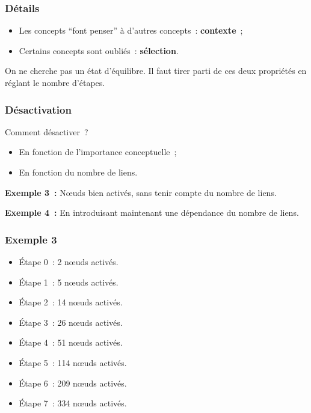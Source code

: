 \documentclass[12pt, handout]{beamer}
\begin{document}
\begin{frame}
 \frametitle{Détails}
 
 \begin{itemize}
  \item Les concepts ``font penser'' à d'autres concepts~: \textbf{contexte}~;
  \item Certains concepts sont oubliés~: \textbf{sélection}.
 \end{itemize}

 On ne cherche pas un état d'équilibre. Il faut tirer parti de ces deux propriétés en réglant le nombre d'étapes.
 
\end{frame}

\begin{frame}
  \frametitle{Désactivation}
 
 \begin{block}{Comment désactiver~?}
 \begin{itemize}
  \item En fonction de l'importance conceptuelle~;
  \item En fonction du nombre de liens.
  \end{itemize}
 \end{block}

 \textbf{Exemple 3~:}  N\oe{}uds bien activés, sans tenir compte du nombre de liens.
 
 \textbf{Exemple 4~:} En introduisant maintenant une dépendance du nombre de liens.
 
 
 
\end{frame}


\begin{frame}
\frametitle{Exemple 3}

\begin{itemize}
 \item Étape 0~: 2  n\oe{}uds activés.
 \item Étape 1~: 5  n\oe{}uds activés.
 \item Étape 2~: 14 n\oe{}uds activés.
 \item Étape 3~: 26 n\oe{}uds activés.
 \item Étape 4~: 51 n\oe{}uds activés.
 \item Étape 5~: 114 n\oe{}uds activés.
 \item Étape 6~: 209 n\oe{}uds activés.
 \item Étape 7~: 334 n\oe{}uds activés.
\end{itemize}


\end{frame}
\end{document}
